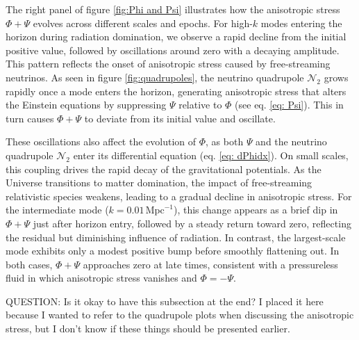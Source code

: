 \documentclass{aa}
\numberwithin{equation}{section}
\numberwithin{table}{section}
\numberwithin{figure}{section}
\begin{document}
The right panel of figure \ref{fig:Phi and Psi} illustrates how the anisotropic stress $\Phi + \Psi$ evolves across different scales and epochs. For high-$k$ modes entering the horizon during radiation domination, we observe a rapid decline from the initial positive value, followed by oscillations around zero with a decaying amplitude. This pattern reflects the onset of anisotropic stress caused by free-streaming neutrinos. As seen in figure \ref{fig:quadrupoles}, the neutrino quadrupole $\mathcal{N}_2$ grows rapidly once a mode enters the horizon, generating anisotropic stress that alters the Einstein equations by suppressing $\Psi$ relative to $\Phi$ (see eq. \eqref{eq: Psi}). This in turn causes $\Phi + \Psi$ to deviate from its initial value and oscillate.

These oscillations also affect the evolution of $\Phi$, as both $\Psi$ and the neutrino quadrupole $\mathcal{N}_2$ enter its differential equation (eq. \eqref{eq: dPhidx}). On small scales, this coupling drives the rapid decay of the gravitational potentials. As the Universe transitions to matter domination, the impact of free-streaming relativistic species weakens, leading to a gradual decline in anisotropic stress. For the intermediate mode ($k = 0.01\,\text{Mpc}^{-1}$), this change appears as a brief dip in $\Phi + \Psi$ just after horizon entry, followed by a steady return toward zero, reflecting the residual but diminishing influence of radiation. In contrast, the largest-scale mode exhibits only a modest positive bump before smoothly flattening out. In both cases, $\Phi + \Psi$ approaches zero at late times, consistent with a pressureless fluid in which anisotropic stress vanishes and $\Phi = -\Psi$.

\color{Plum}
QUESTION: Is it okay to have this subsection at the end? I placed it here because I wanted to refer to the quadrupole plots when discussing the anisotropic stress, but I don't know if these things should be presented earlier.
\color{black}





\end{document}
